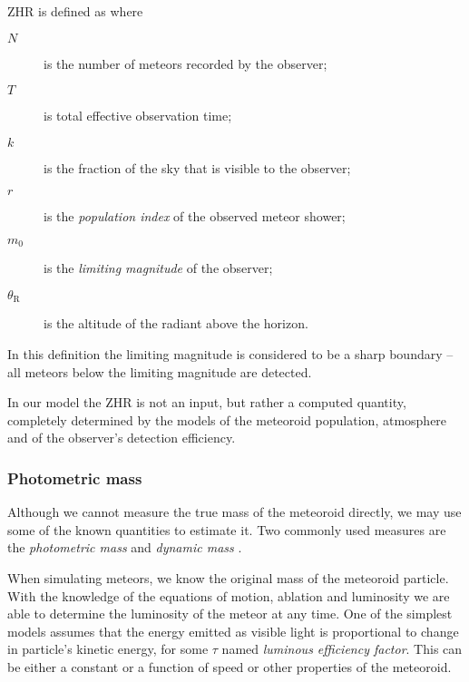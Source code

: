             ZHR is defined as
            where
            \begin{description}
                \item[$N$]
                    is the number of meteors recorded by the observer;
                \item[$T$]
                    is total effective observation time;
                \item[$k$]
                    is the fraction of the sky that is visible to the observer;
                \item[$r$]
                    is the \emph{population index} of the observed meteor shower;
                \item[$m_0$]
                    is the \emph{limiting magnitude} of the observer;
                \item[$\theta_\mathrm{R}$]
                    is the altitude of the radiant above the horizon.
            \end{description}
            In this definition the limiting magnitude is considered to be a sharp boundary -- all
            meteors below the limiting magnitude are detected.

            In our model the ZHR is not an input, but rather a computed quantity, completely determined by the
            models of the meteoroid population, atmosphere and of the observer's detection efficiency.

        \subsubsection{Photometric mass} \label{msaf}
            Although we cannot measure the true mass of the meteoroid directly,
            we may use some of the known quantities to estimate it.
            Two commonly used measures are the \emph{photometric mass} and \emph{dynamic mass} \citep{ceplecha1966}.

            When simulating meteors, we know the original mass of the meteoroid particle.
            With the knowledge of the equations of motion, ablation and luminosity
            we are able to determine the luminosity of the meteor at any time.
            One of the simplest models \citep{hill+2005} assumes that the energy emitted as visible light
            is proportional to change in particle's kinetic energy,
            for some $\tau$ named \emph{luminous efficiency factor}. This can be either a constant
            or a function of speed or other properties of the meteoroid.

